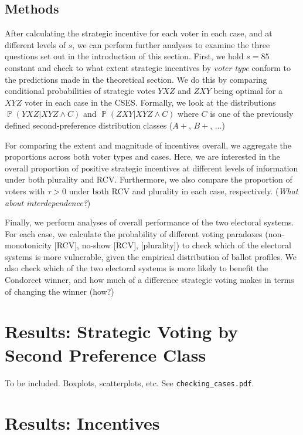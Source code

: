 \documentclass[12pt, letter, margin = 1.5 in]{article}
\DeclareMathOperator{\Prob}{\mathbb{P}}
\begin{document}
\subsection{Methods}


After calculating the strategic incentive for each voter in each case, and at different levels of $s$, we can perform further analyses to examine the three questions set out in the introduction of this section. First, we hold $s = 85$ constant and check to what extent strategic incentives by \emph{voter type} conform to the predictions made in the theoretical section. We do this by comparing conditional probabilities of strategic votes $YXZ$ and $ZXY$ being optimal for a $XYZ$ voter in each case in the CSES. Formally, we look at the distributions $\Prob(YXZ | XYZ \land C)$ and $\Prob(ZXY | XYZ \land C)$ where $C$ is one of the previously defined second-preference distribution classes ($A+$, $B+$, $\ldots$)

For comparing the extent and magnitude of incentives overall, we aggregate the proportions across both voter types and cases. Here, we are interested in the overall proportion of positive strategic incentives at different levels of information under both plurality and RCV. Furthermore, we also compare the proportion of voters with $\tau > 0$ under both RCV and plurality in each case, respectively. (\emph{What about interdependence?})

Finally, we perform analyses of overall performance of the two electoral systems. For each case, we calculate the probability of different voting paradoxes (non-monotonicity [RCV], no-show [RCV], [plurality]) to check which of the electoral systems is more vulnerable, given the empirical distribution of ballot profiles. We also check which of the two electoral systems is more likely to benefit the Condorcet winner, and how much of a difference strategic voting makes in terms of changing the winner (how?)

\section{Results: Strategic Voting by Second Preference Class}

To be included. Boxplots, scatterplots, etc. See \texttt{checking\_cases.pdf}.

\section{Results: Incentives}
\end{document}
